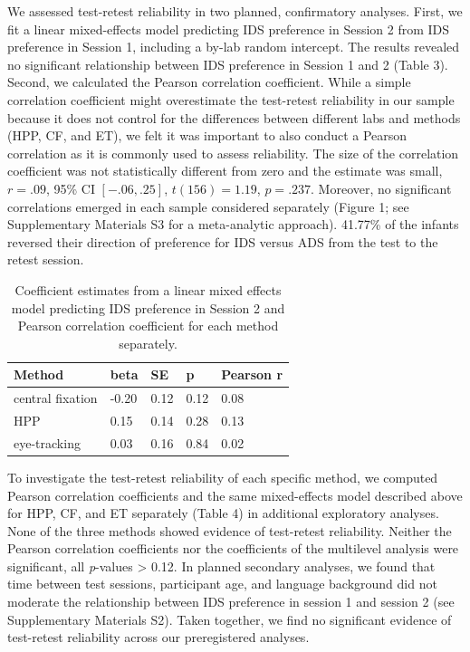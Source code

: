 \documentclass[
  man,floatsintext]{apa6}
\begin{document}
We assessed test-retest reliability in two planned, confirmatory analyses.
First, we fit a linear mixed-effects model predicting IDS preference in Session 2 from IDS preference in Session 1, including a by-lab random intercept.
The results revealed no significant relationship between IDS preference in Session 1 and 2 (Table 3).
Second, we calculated the Pearson correlation coefficient.
While a simple correlation coefficient might overestimate the test-retest reliability in our sample because it does not control for the differences between different labs and methods (HPP, CF, and ET), we felt it was important to also conduct a Pearson correlation as it is commonly used to assess reliability.
The size of the correlation coefficient was not statistically different from zero and the estimate was small, \(r = .09\), 95\% CI \([-.06, .25]\), \(t(156) = 1.19\), \(p = .237\).
Moreover, no significant correlations emerged in each sample considered separately (Figure 1; see Supplementary Materials S3 for a meta-analytic approach).
41.77\% of the infants reversed their direction of preference for IDS versus ADS from the test to the retest session.

\begin{table}[tbp]

\begin{center}
\begin{threeparttable}

\caption{\label{tab:unnamed-chunk-6}Coefficient estimates from a linear mixed effects model predicting IDS preference in Session 2 and Pearson correlation coefficient for each method separately.}

\begin{tabular}{lllll}
\toprule
Method & beta & SE & p & Pearson r\\
\midrule
central fixation & -0.20 & 0.12 & 0.12 & 0.08\\
HPP & 0.15 & 0.14 & 0.28 & 0.13\\
eye-tracking & 0.03 & 0.16 & 0.84 & 0.02\\
\bottomrule
\end{tabular}

\end{threeparttable}
\end{center}

\end{table}

To investigate the test-retest reliability of each specific method, we computed Pearson correlation coefficients and the same mixed-effects model described above for HPP, CF, and ET separately (Table 4) in additional exploratory analyses.
None of the three methods showed evidence of test-retest reliability.
Neither the Pearson correlation coefficients nor the coefficients of the multilevel analysis were significant, all \emph{p}-values \textgreater{} 0.12.
In planned secondary analyses, we found that time between test sessions, participant age, and language background did not moderate the relationship between IDS preference in session 1 and session 2 (see Supplementary Materials S2).
Taken together, we find no significant evidence of test-retest reliability across our preregistered analyses.
\end{document}
